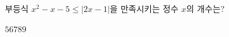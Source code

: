 부등식 $x^2-x-5\le |2x-1|$을 만족시키는 정수 $x$의 개수는?
\begin{choices32}{$5$}{$6$}{$7$}{$8$}{$9$}\end{choices32}
